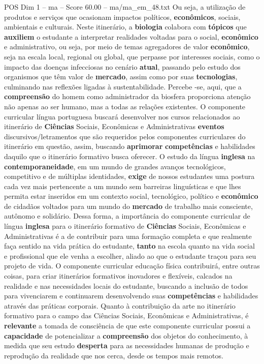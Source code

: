 \begin{textsample}{POS Dim 1 – ma – Score 60.00 – ma/ma\_em\_48.txt}
Ou seja, a utilização de produtos e serviços que ocasionam impactos políticos, \textbf{econômicos}, sociais, ambientais e culturais.
Neste itinerário, a \textbf{biologia} colabora com \textbf{tópicos} que \textbf{auxiliem} o estudante a interpretar realidades voltadas para o social, \textbf{econômico} e administrativo, ou seja, por meio de temas agregadores de valor \textbf{econômico}, seja na escala local, regional ou global, que perpasse por interesses sociais, como o impacto das doenças infecciosas no cenário \textbf{atual}, passando pelo estudo dos organismos que têm valor de \textbf{mercado}, assim como por suas \textbf{tecnologias}, culminando nas reflexões ligadas à sustentabilidade.
Percebe -se, aqui, que a \textbf{compreensão} do homem como administrador da biosfera proporciona atenção não apenas ao ser humano, mas a todas as relações existentes.
O componente curricular língua portuguesa buscará desenvolver nos cursos relacionados ao itinerário de \textbf{Ciências} Sociais, Econômicas e Administrativas \textbf{eventos} discursivos/letramentos que são requeridos pelos componentes curriculares do itinerário em questão, assim, buscando \textbf{aprimorar} \textbf{competências} e habilidades daquilo que o itinerário formativo busca oferecer.
O estudo da língua \textbf{inglesa} na \textbf{contemporaneidade}, em um mundo de grandes avanços tecnológicos, competitivo e de múltiplas identidades, \textbf{exige} de nossos estudantes uma postura cada vez mais pertencente a um mundo sem barreiras linguísticas e que lhes permita estar inseridos em um contexto social, tecnológico, político e \textbf{econômico} de cidadãos voltados para um mundo do \textbf{mercado} de trabalho mais consciente, autônomo e solidário.
Dessa forma, a importância do componente curricular de língua \textbf{inglesa} para o itinerário formativo de \textbf{Ciências} Sociais, Econômicas e Administrativas é a de contribuir para uma formação completa e que realmente faça sentido na vida prática do estudante, \textbf{tanto} na escola quanto na vida social e profissional que ele venha a escolher, aliado ao que o estudante traçou para seu projeto de vida.
O componente curricular educação física contribuirá, entre outras coisas, para criar itinerários formativos inovadores e flexíveis, calcados na realidade e nas necessidades locais do estudante, buscando a inclusão de todos para vivenciarem e continuarem desenvolvendo suas \textbf{competências} e habilidades através das práticas corporais.
Quanto à contribuição da arte no itinerário formativo para o campo das Ciências Sociais, Econômicas e Administrativas, é \textbf{relevante} a tomada de consciência de que este componente curricular possui a \textbf{capacidade} de potencializar a \textbf{compreensão} dos objetos do conhecimento, à medida que seu estudo \textbf{desperta} para as necessidades humanas de produção e reprodução da realidade que nos cerca, desde os tempos mais remotos.

\end{textsample}
